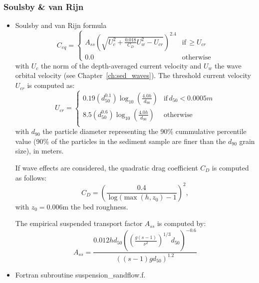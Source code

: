 \subsubsection{Soulsby \& van Rijn}
\begin{itemize}
\item Soulsby and van Rijn formula~\cite{Soulsby97} 
  \begin{equation*}
C_{eq}=\left\{\begin{array}{ll}
A_{ss}\left(\sqrt{U_c^2+\frac{0.018}{C_D}U_w^2-U_{cr}}\right)^{2.4} & \text{if}\, \geq U_{cr}\\
0.0 &  \text{otherwise}
\end{array}
\right.    
\end{equation*}
  with $U_c$ the norm of the depth-averaged current velocity and $U_w$ the wave orbital velocity (see Chapter~\ref{ch:sed_waves}). The threshold current velocity $U_{cr}$ is computed as:
\begin{equation*}
U_{cr}=\left\{\begin{array}{ll}  
  0.19 (d_{50}^{0.1})\log_{10}\left(\frac{4.0 h}{d_{90}}\right) & \text{if}\, d_{50} < 0.0005 m\\
  8.5 (d_{50}^{0.6})\log_{10}\left(\frac{4.0 h}{d_{90}}\right) & \text{otherwise}\\
\end{array}
\right.    
\end{equation*}
with $d_{90}$ the particle diameter representing the 90\% cummulative percentile value (90\% of the particles in the sediment sample are finer than the $d_{90}$ grain size), in meters. 

If wave effects are considered, the quadratic drag coefficient $C_D$ is computed as follows:
\begin{equation*}
  C_D = \left(\frac{0.4}{\log(\max(h, z_{0})-1}\right)^{2},
\end{equation*}
with $z_{0}=0.006$m the bed roughness.

The empirical suspended transport factor $A_{ss}$ is computed by:
\begin{equation*}
A_{ss} = \frac{0.012 h d_{50} \left(\left(\frac{g(s-1)}{\nu^2}\right)^{1/3}d_{50}\right)^{-0.6}}{\left((s-1)g d_{50}\right)^{1.2}}
\end{equation*}
\item Fortran subroutine {\ttfamily suspension\_sandflow.f}.
\end{itemize}

